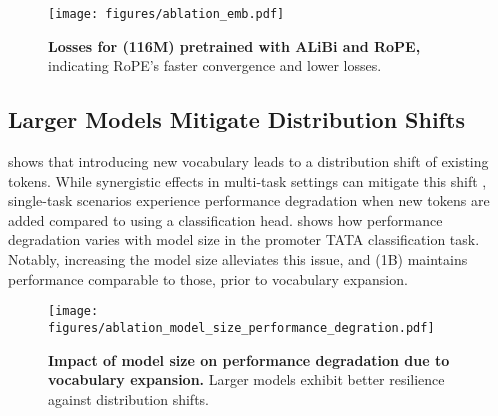 \begin{figure}[h!]
    \centering
    \texttt{[image: figures/ablation\_emb.pdf]}
    \vspace{-2em} %
    \caption{\textbf{Losses for \method(116M) pretrained with ALiBi and RoPE,} indicating RoPE’s faster convergence and lower losses.} 
    \label{fig:embedding}
\end{figure}

\subsection{Larger Models Mitigate Distribution Shifts} %
 shows that introducing new vocabulary leads to a distribution shift of existing tokens. While synergistic effects in multi-task settings can mitigate this shift \cite{son2024multi}, single-task scenarios experience performance degradation when new tokens are added compared to using a classification head.  shows how performance degradation varies with model size in the promoter TATA classification task. 
Notably, increasing the model size alleviates this issue, and \method(1B) maintains performance comparable to those, prior to vocabulary expansion.

\begin{figure}[ht!]
    \centering
    \texttt{[image: figures/ablation\_model\_size\_performance\_degration.pdf]}
    \vspace{-1em} %
    \caption{\textbf{Impact of model size on performance degradation due to vocabulary expansion.} Larger models exhibit better resilience against distribution shifts.}
    \label{fig:vocab_expansion}
\end{figure}


